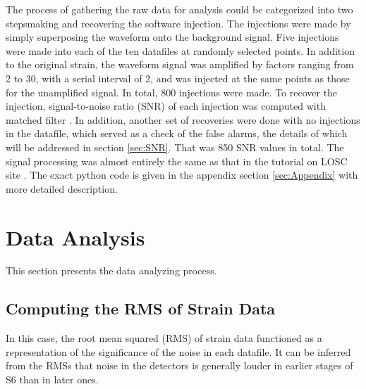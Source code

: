 \documentclass[aps,prd,preprint]{revtex4}
\begin{document}
\par The process of gathering the raw data for analysis could be categorized into two steps\textemdash making and recovering the software injection. The injections were made by simply superposing the waveform onto the background signal. Five injections were made into each of the ten datafiles at randomly selected points. In addition to the original strain, the waveform signal was amplified by factors ranging from 2 to 30, with a serial interval of 2, and was injected at the same points as those for the unamplified signal. In total, 800 injections were made. To recover the injection, signal-to-noise ratio (SNR) \cite{SNR} of each injection was computed with matched filter \cite{findChirp}. In addition, another set of recoveries were done with no injections in the datafile, which served as a check of the false alarms, the details of which will be addressed in section \ref{sec:SNR}. That was 850 SNR values in total. The signal processing was almost entirely the same as that in the tutorial on LOSC site \cite{GWTutorial}. The exact python code is given in the appendix section \ref{sec:Appendix} with more detailed description.


\section{Data Analysis}
This section presents the data analyzing process.

\subsection{Computing the RMS of Strain Data}
In this case, the root mean squared (RMS) \cite{RMS} of strain data functioned as a representation of the significance of the noise in each datafile. It can be inferred from the RMSs that noise in the detectors is generally louder in earlier stages of S6 than in later ones.
\begin{table}
	\caption{RMS calculated from each raw datafile. \label{tab:RMS}}
	
\end{table}
\end{document}
